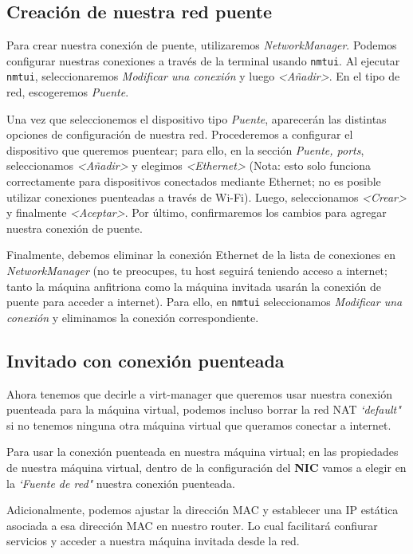 \documentclass[11pt]{article}
\begin{document}
\subsection{Creación de nuestra red puente}

Para crear nuestra conexión de puente, utilizaremos \emph{NetworkManager}. Podemos configurar nuestras conexiones a través de la terminal usando \texttt{nmtui}. Al ejecutar \texttt{nmtui}, seleccionaremos \emph{Modificar una conexión} y luego \emph{<Añadir>}. En el tipo de red, escogeremos \emph{Puente}.

Una vez que seleccionemos el dispositivo tipo \emph{Puente}, aparecerán las distintas opciones de configuración de nuestra red. Procederemos a configurar el dispositivo que queremos puentear; para ello, en la sección \emph{Puente, ports}, seleccionamos \emph{<Añadir>} y elegimos \emph{<Ethernet>} (Nota: esto solo funciona correctamente para dispositivos conectados mediante Ethernet; no es posible utilizar conexiones puenteadas a través de Wi-Fi). Luego, seleccionamos \emph{<Crear>} y finalmente \emph{<Aceptar>}. Por último, confirmaremos los cambios para agregar nuestra conexión de puente.

Finalmente, debemos eliminar la conexión Ethernet de la lista de conexiones en \emph{NetworkManager} (no te preocupes, tu host seguirá teniendo acceso a internet; tanto la máquina anfitriona como la máquina invitada usarán la conexión de puente para acceder a internet). Para ello, en \texttt{nmtui} seleccionamos \emph{Modificar una conexión} y eliminamos la conexión correspondiente.

\subsection{Invitado con conexión puenteada}

Ahora tenemos que decirle a virt-manager que queremos usar nuestra conexión puenteada para la máquina virtual, podemos incluso borrar la red NAT \emph{`default"} si no tenemos ninguna otra máquina virtual que queramos conectar a internet.

Para usar la conexión puenteada en nuestra máquina virtual; en las propiedades de nuestra máquina virtual, dentro de la configuración del \textbf{NIC} vamos a elegir en la \emph{`Fuente de red"} nuestra conexión puenteada.

Adicionalmente, podemos ajustar la dirección MAC y establecer una IP estática asociada a esa dirección MAC en nuestro router. Lo cual facilitará confiurar servicios y acceder a nuestra máquina invitada desde la red.
\end{document}

